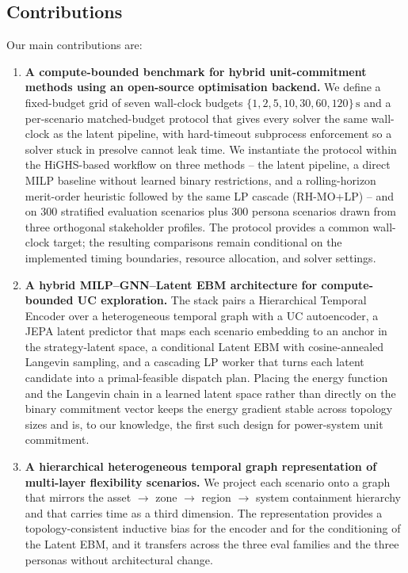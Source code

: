 \documentclass{article}
\begin{document}
\subsection{Contributions}
Our main contributions are:
\begin{enumerate}[label=\textbf{C\arabic*}, leftmargin=*, itemsep=3pt]

  \item \textbf{A compute-bounded benchmark for hybrid unit-commitment methods using an open-source optimisation backend.} We define a fixed-budget grid of seven wall-clock budgets $\{1, 2, 5, 10, 30, 60, 120\}\,\mathrm{s}$ and a per-scenario matched-budget protocol that gives every solver the same wall-clock as the latent pipeline, with hard-timeout subprocess enforcement so a solver stuck in presolve cannot leak time. We instantiate the protocol within the HiGHS-based workflow on three methods -- the latent pipeline, a direct MILP baseline without learned binary restrictions, and a rolling-horizon merit-order heuristic followed by the same LP cascade (RH-MO+LP) -- and on $300$ stratified evaluation scenarios plus $300$ persona scenarios drawn from three orthogonal stakeholder profiles. The protocol provides a common wall-clock target; the resulting comparisons remain conditional on the implemented timing boundaries, resource allocation, and solver settings.

  \item \textbf{A hybrid MILP--GNN--Latent EBM architecture for compute-bounded UC exploration.} The stack pairs a Hierarchical Temporal Encoder over a heterogeneous temporal graph with a UC autoencoder, a JEPA latent predictor that maps each scenario embedding to an anchor in the strategy-latent space, a conditional Latent EBM with cosine-annealed Langevin sampling, and a cascading LP worker that turns each latent candidate into a primal-feasible dispatch plan. Placing the energy function and the Langevin chain in a learned latent space rather than directly on the binary commitment vector keeps the energy gradient stable across topology sizes and is, to our knowledge, the first such design for power-system unit commitment.

  \item \textbf{A hierarchical heterogeneous temporal graph representation of multi-layer flexibility scenarios.} We project each scenario onto a graph that mirrors the asset $\to$ zone $\to$ region $\to$ system containment hierarchy and that carries time as a third dimension. The representation provides a topology-consistent inductive bias for the encoder and for the conditioning of the Latent EBM, and it transfers across the three eval families and the three personas without architectural change.


\end{enumerate}
\end{document}
